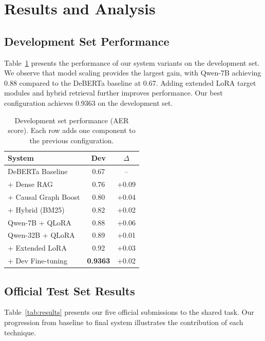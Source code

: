 \documentclass[11pt]{article}
\begin{document}
\section{Results and Analysis}

\subsection{Development Set Performance}

Table~\ref{tab:dev_results} presents the performance of our system variants on the development set. We observe that model scaling provides the largest gain, with Qwen-7B achieving 0.88 compared to the DeBERTa baseline at 0.67. Adding extended LoRA target modules and hybrid retrieval further improves performance. Our best configuration achieves 0.9363 on the development set.

\begin{table}[t]
\centering
\small
\begin{tabular}{lcc}
\toprule
\textbf{System} & \textbf{Dev} & \textbf{$\Delta$} \\
\midrule
DeBERTa Baseline & 0.67 & -- \\
+ Dense RAG & 0.76 & +0.09 \\
+ Causal Graph Boost & 0.80 & +0.04 \\
+ Hybrid (BM25) & 0.82 & +0.02 \\
\midrule
Qwen-7B + QLoRA & 0.88 & +0.06 \\
Qwen-32B + QLoRA & 0.89 & +0.01 \\
+ Extended LoRA & 0.92 & +0.03 \\
+ Dev Fine-tuning & \textbf{0.9363} & +0.02 \\
\bottomrule
\end{tabular}
\caption{Development set performance (AER score). Each row adds one component to the previous configuration.}
\label{tab:dev_results}
\end{table}



\subsection{Official Test Set Results}

Table~\ref{tab:results} presents our five official submissions to the shared task. Our progression from baseline to final system illustrates the contribution of each technique.
\end{document}
